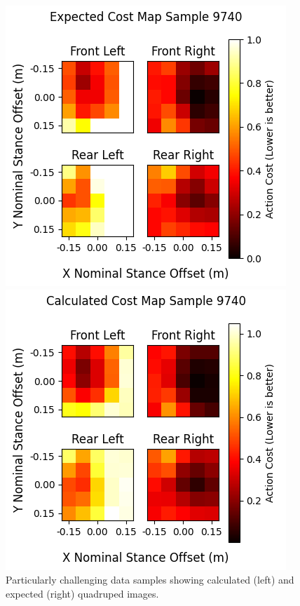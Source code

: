 \begin{figure}[H]
  \centering
  \begin{minipage}[T]{0.45\textwidth}
    \centering
    \includegraphics[width=\textwidth]{images/data/training/challenging-expected.png}
  \end{minipage}
  \hfill
  \begin{minipage}[T]{0.45\textwidth}
    \centering
    \includegraphics[width=\textwidth]{images/data/training/challenging-calculated.png}
  \end{minipage}
  \hfill

  \caption{Particularly challenging data samples showing calculated (left) and
  expected (right) quadruped images.}
  \label{fig:data-cn-challenging-comparison}
\end{figure}
